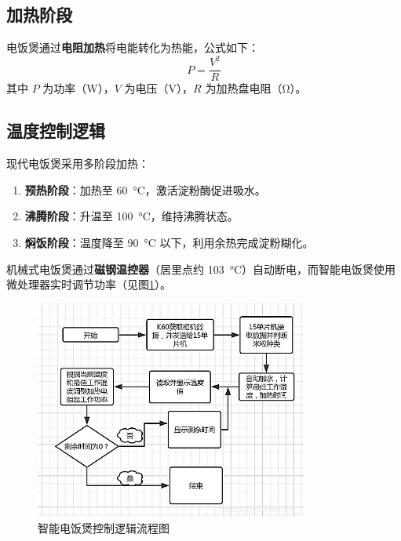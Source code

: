 \documentclass[UTF8]{ctexart}
\begin{document}
\subsection{加热阶段}
电饭煲通过\textbf{电阻加热}将电能转化为热能，公式如下：
\begin{equation}
    P = \frac{V^2}{R}
\end{equation}
其中 \( P \) 为功率（\si{\watt}），\( V \) 为电压（\si{\volt}），\( R \) 为加热盘电阻（\si{\ohm}）。

\subsection{温度控制逻辑}
现代电饭煲采用多阶段加热：
\begin{enumerate}
    \item \textbf{预热阶段}：加热至 \SI{60}{\celsius}，激活淀粉酶促进吸水。
    \item \textbf{沸腾阶段}：升温至 \SI{100}{\celsius}，维持沸腾状态。
    \item \textbf{焖饭阶段}：温度降至 \SI{90}{\celsius} 以下，利用余热完成淀粉糊化。
\end{enumerate}

机械式电饭煲通过\textbf{磁钢温控器}（居里点约 \SI{103}{\celsius}）自动断电，而智能电饭煲使用微处理器实时调节功率（见图\ref{fig:control_logic}）。

\begin{figure}[ht]
    \centering
    \includegraphics[width=0.8\textwidth]{images/control_logic.png} %
    \caption{智能电饭煲控制逻辑流程图}
    \label{fig:control_logic}
\end{figure}
\end{document}
